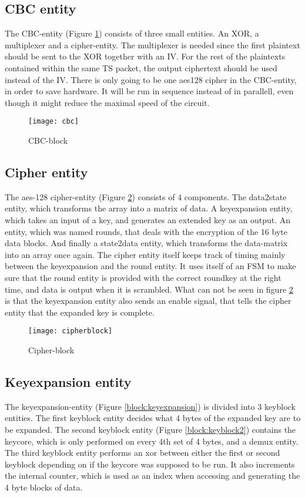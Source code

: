 \subsection{CBC entity}
The CBC-entity (Figure \ref{block:cbc}) consists of three small 
entities. An XOR, a multiplexer and a cipher-entity. The multiplexer is 
needed since the first plaintext should be sent to the XOR together 
with an IV. For the rest of the plaintexts contained within the same 
TS packet, the output ciphertext should be used instead of the IV. 
There is only going to be one aes128 cipher in the CBC-entity, in order 
to save hardware. It will be run in sequence instead of in parallell, 
even though it might reduce the maximal speed of the circuit.

\begin{figure}[h!]
  \centering
  \texttt{[image: cbc]}
  \caption{CBC-block}
  \label{block:cbc}
\end{figure}

\subsection{Cipher entity}
The aes-128 cipher-entity (Figure \ref{block:cipher}) consists of 4 
components. The data2state entity, which transforms the array into a 
matrix of data. A keyexpansion entity, which takes an input of a key, 
and generates an extended key as an output. An entity, which was named  
rounds, that deals with the encryption of the 16 byte data blocks. 
And finally a state2data entity, which transforms the data-matrix into 
an array once again. The cipher entity itself keeps track of timing 
mainly between the keyexpansion and the round entity. It uses itself of 
an FSM to make sure that the round entity is provided with the correct 
roundkey at the right time, and data is output when it is scrambled. 
What can not be seen in figure \ref{block:cipher} is that the 
keyexpansion entity also sends an enable signal, that tells the cipher 
entity that the expanded key is complete.

\begin{figure}[h!]
  \centering
  \texttt{[image: cipherblock]}
  \caption{Cipher-block}
  \label{block:cipher}
\end{figure}

\subsection{Keyexpansion entity}
The keyexpansion-entity (Figure \ref{block:keyexpansion}) is divided 
into 3 keyblock entities. The first keyblock entity decides what 4 
bytes of the expanded key are to be expanded. The second keyblock 
entity (Figure \ref{block:keyblock2}) contains the keycore, which is 
only performed on every 4th set of 4 bytes, and a demux entity. 
The third keyblock entity performs an xor between either the first or 
second keyblock depending on if the keycore was supposed to be run. It 
also increments the internal counter, which is used as an index when 
accessing and generating the 4 byte blocks of data.

